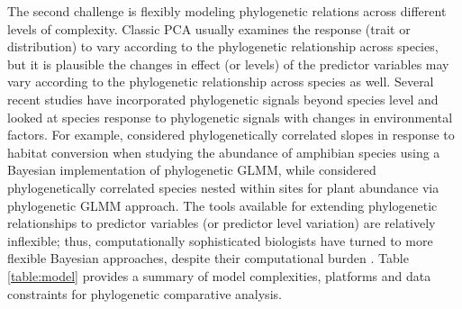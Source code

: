 \documentclass[12pt]{article}
\begin{document}
The second challenge is flexibly modeling phylogenetic relations across different levels of complexity.
Classic PCA usually examines the response (trait or distribution) to vary according to the phylogenetic relationship across species, but it is plausible the changes in effect (or levels) of the predictor variables 
may vary according to the phylogenetic relationship across species as well.
Several recent studies have incorporated phylogenetic signals beyond species level and looked at species response to phylogenetic signals with changes in environmental factors.
For example, \cite{nowakowski2018phylogenetic} considered phylogenetically correlated slopes in response to habitat conversion when studying the abundance of amphibian species using a Bayesian implementation of phylogenetic GLMM, while \cite{li2017canfun} considered phylogenetically correlated species nested within sites for plant abundance via phylogenetic GLMM approach. 
The tools available for extending phylogenetic relationships to predictor variables (or predictor level variation) are relatively inflexible; thus, computationally sophisticated biologists have turned to more flexible Bayesian approaches, despite their computational burden \citep{hadfield2010mcmc, burkner2016brms}.
Table \ref{table:model} provides a summary of model complexities, platforms and data constraints for phylogenetic comparative analysis.

\newcommand{\pkg}[1]{{\tt #1}}
\newcommand{\code}[1]{{\tt #1}}
\end{document}
